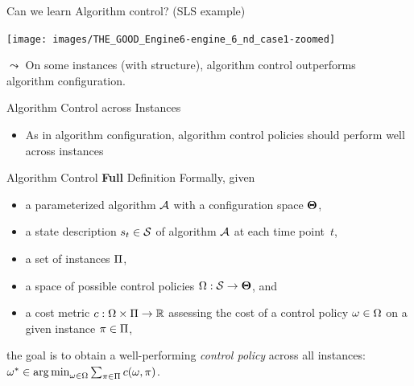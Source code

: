 \begin{frame}[c]{Can we learn Algorithm control? (SLS example)}

\texttt{[image: images/THE\_GOOD\_Engine6-engine\_6\_nd\_case1-zoomed]}

\pause
$\leadsto$ On some instances (with structure), algorithm control outperforms\\ algorithm configuration.

\end{frame}
\begin{frame}[c]{Algorithm Control across Instances}

\begin{itemize}
  \item As in algorithm configuration, algorithm control policies should perform well across instances
\end{itemize}

\begin{block}{Algorithm Control \textbf{Full} Definition}
Formally, given
\begin{itemize}
  \item a parameterized algorithm $\mathcal{A}$ with a configuration space $\mathbf{\Theta}$,
  \pause
  \item a state description $s_t \in \mathcal{S}$ of algorithm $\mathcal{A}$ at each time point~$t$,
  \pause
  \item \alert{a set of instances $\Pi$,}
  \pause
  \item a space of possible control policies $\Omega: \mathcal{S} \to \mathbf{\Theta}$, and
  \pause
  \item a cost metric $c: \Omega \times \Pi \to \mathbb{R}$ assessing the cost of a control policy $\omega \in \Omega$ on a given instance $\pi \in \Pi$,
\end{itemize}

\noindent the goal is to obtain a well-performing \emph{control policy} across all instances: $\omega^* \in \operatorname*{arg\,min}_{\omega \in \Omega} \sum_{\pi \in \Pi}c(\omega, \pi)$.
\end{block}

\end{frame}
